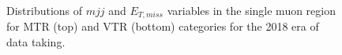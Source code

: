 \begin{figure}[htbp]
{    }
  \caption{Distributions of $mjj$ and $E_{T,miss}$ variables in the single muon region for MTR (top) and VTR (bottom) categories for the 2018 era of data taking.}
  \label{fig:2018_Wmunu_1}
\end{figure}


